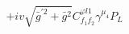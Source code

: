 %
\begin{dmath*}
%
  +  i v \sqrt{{\bar g}^{\prime 2} + {\bar g}{}^2}C^{ \varphi  l1}_{f_1 f_2} \gamma^{\mu_4} P_L
%
\end{dmath*}
%
